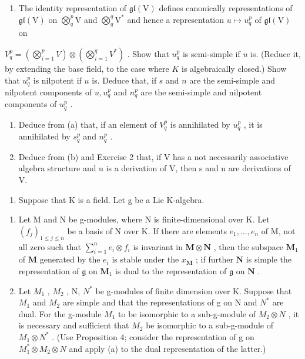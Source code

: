 \begin{enumerate}
\def\labelenumi{(\alph{enumi})}
\tightlist
\item
  The identity representation of \(\mathfrak{gl}(\mathrm{V})\) defines canonically representations of \(\mathfrak{gl}(\mathrm{V})\) on \(\bigotimes_{q}^{p}\mathrm{V}\) and \(\bigotimes_{q}^{q}\mathrm{V}^{*}\) and hence a representation \(u\mapsto u_q^p\) of \(\mathfrak{gl}(\mathrm{V})\) on
\end{enumerate}

\(V_{q}^{p} = \left( \bigotimes_{i=1}^{p} V \right) \otimes \left( \bigotimes_{i=1}^{q} V^{*} \right)\) . Show that \(u_{q}^{p}\) is semi-simple if \(u\) is. (Reduce it, by extending the base field, to the case where \(K\) is algebraically closed.) Show that \(u_{q}^{p}\) is nilpotent if \(u\) is. Deduce that, if \(s\) and \(n\) are the semi-simple and nilpotent components of \(u, u_{q}^{p}\) and \(n_{q}^{p}\) are the semi-simple and nilpotent components of \(u_{q}^{p}\) .

\begin{enumerate}
\def\labelenumi{(\alph{enumi})}
\setcounter{enumi}{1}
\item
  Deduce from (a) that, if an element of \(V_q^p\) is annihilated by \(u_q^p\) , it is annihilated by \(s_q^p\) and \(n_q^p\) .
\item
  Deduce from (b) and Exercise 2 that, if V has a not necessarily associative algebra structure and u is a derivation of V, then s and n are derivations of V.
\end{enumerate}

\begin{enumerate}
\def\labelenumi{\arabic{enumi}.}
\setcounter{enumi}{3}
\tightlist
\item
  Suppose that K is a field. Let g be a Lie K-algebra.
\end{enumerate}

\begin{enumerate}
\def\labelenumi{(\alph{enumi})}
\item
  Let M and N be g-modules, where N is finite-dimensional over K. Let \((f_{j})_{1 \leqslant j \leqslant n}\) be a basis of N over K. If there are elements \(e_{1}, \ldots, e_{n}\) of M, not all zero such that \(\sum_{i=1}^{n} e_i \otimes f_i\) is invariant in \(\mathbf{M} \otimes \mathbf{N}\) , then the subspace \(\mathbf{M}_1\) of \(\mathbf{M}\) generated by the \(e_i\) is stable under the \(x_{\mathbf{M}}\) ; if further \(\mathbf{N}\) is simple the representation of \(\mathfrak{g}\) on \(\mathbf{M}_1\) is dual to the representation of \(\mathfrak{g}\) on \(\mathbf{N}\) .
\item
  Let \(M_{1}\) , \(M_{2}\) , N, \(N^{*}\) be g-modules of finite dimension over K. Suppose that \(M_{1}\) and \(M_{2}\) are simple and that the representations of g on N and \(N^{*}\) are dual. For the g-module \(M_{1}\) to be isomorphic to a sub-g-module of \(M_{2} \otimes N\) , it is necessary and sufficient that \(M_{2}\) be isomorphic to a sub-g-module of \(M_{1} \otimes N^{*}\) . (Use Proposition 4; consider the representation of g on \(M_{1}^{*} \otimes M_{2} \otimes N\) and apply (a) to the dual representation of the latter.)
\end{enumerate}

